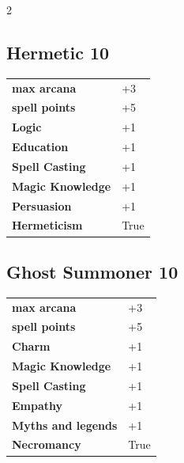 \begin{multicols}{2}
\begin{tcolorbox}

\end{tcolorbox}

\begin{tcolorbox}
    \subsection*{Hermetic \hfill \small{10 }}
    \tcblower




\begin{tabular}{@{}ll@{}}
    \textbf{max arcana} & +3\\
    \textbf{spell points} & +5\\
    \textbf{Logic} & +1\\
    \textbf{Education} & +1\\
    \textbf{Spell Casting} & +1\\
    \textbf{Magic Knowledge} & +1\\
    \textbf{Persuasion} & +1\\
    \textbf{Hermeticism} & True\\
\end{tabular}


\end{tcolorbox}

\begin{tcolorbox}
    \subsection*{Ghost Summoner \hfill \small{10 }}
    \tcblower




\begin{tabular}{@{}ll@{}}
    \textbf{max arcana} & +3\\
    \textbf{spell points} & +5\\
    \textbf{Charm} & +1\\
    \textbf{Magic Knowledge} & +1\\
    \textbf{Spell Casting} & +1\\
    \textbf{Empathy} & +1\\
    \textbf{Myths and legends} & +1\\
    \textbf{Necromancy} & True\\
\end{tabular}


\end{tcolorbox}
\end{multicols}
